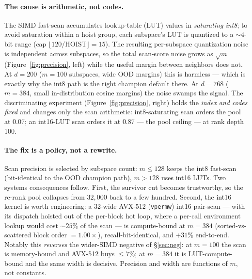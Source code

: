 \documentclass{article}
\begin{document}
\paragraph{The cause is arithmetic, not codes.} The SIMD fast-scan
accumulates lookup-table (LUT) values in \emph{saturating int8}; to avoid
saturation within a hoist group, each subspace's LUT is quantized to a
${\sim}4$-bit range (cap $\lfloor 120/\text{HOIST}\rfloor{=}15$). The resulting
per-subspace quantization noise is independent across subspaces, so the total
scan-score noise grows as $\sqrt{m}$ (Figure~\ref{fig:precision}, left) while the useful margin between neighbors
does not. At $d{=}200$ ($m{=}100$ subspaces, wide OOD margins) this is harmless
--- which is exactly why the int8 path is the right champion default there. At
$d{=}768$ ($m{=}384$, small in-distribution cosine margins) the noise swamps the
signal. The discriminating experiment (Figure~\ref{fig:precision}, right) holds the \emph{index and codes fixed} and
changes only the scan arithmetic: int8-saturating scan orders the pool at $0.07$;
an int16-LUT scan orders it at $0.87$ --- the pool ceiling --- at rank depth 100.

\paragraph{The fix is a policy, not a rewrite.} Scan precision is selected by
subspace count: $m\!\le\!128$ keeps the int8 fast-scan (bit-identical to the OOD
champion path), $m\!>\!128$ uses int16 LUTs. Two systems consequences follow.
First, the survivor cut becomes trustworthy, so the re-rank pool collapses from
$32{,}000$ back to a few hundred. Second, the int16 kernel is worth engineering:
a 32-wide AVX-512 (\texttt{vpermw}) int16 pair-scan --- with its dispatch hoisted
out of the per-block hot loop, where a per-call environment lookup would
cost ${\sim}25\%$ of the scan --- is compute-bound at $m{=}384$
(sorted-vs-scattered block order $= 1.00\times$), recall-bit-identical, and
$+31\%$ end-to-end. Notably this \emph{reverses} the wider-SIMD negative of
\S\ref{sec:neg}: at $m{=}100$ the scan is memory-bound and AVX-512 buys
$\le\!7\%$; at $m{=}384$ it is LUT-compute-bound and the same width is decisive.
Precision and width are functions of $m$, not constants.
\end{document}
